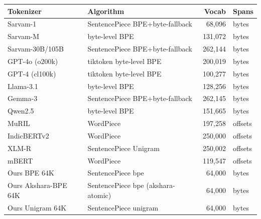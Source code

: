 \begin{tabular}{@{}llrl@{}}
\toprule
Tokenizer & Algorithm & Vocab & Spans \\
\midrule
Sarvam-1 & SentencePiece BPE+byte-fallback & 68,096 & bytes \\
Sarvam-M & byte-level BPE & 131,072 & bytes \\
Sarvam-30B/105B & SentencePiece BPE+byte-fallback & 262,144 & bytes \\
GPT-4o (o200k) & tiktoken byte-level BPE & 200,019 & bytes \\
GPT-4 (cl100k) & tiktoken byte-level BPE & 100,277 & bytes \\
Llama-3.1 & byte-level BPE & 128,256 & bytes \\
Gemma-3 & SentencePiece BPE+byte-fallback & 262,145 & bytes \\
Qwen2.5 & byte-level BPE & 151,665 & bytes \\
MuRIL & WordPiece & 197,258 & offsets \\
IndicBERTv2 & WordPiece & 250,000 & offsets \\
XLM-R & SentencePiece Unigram & 250,002 & offsets \\
mBERT & WordPiece & 119,547 & offsets \\
\midrule
Ours BPE 64K & SentencePiece bpe & 64,000 & bytes \\
Ours Akshara-BPE 64K & SentencePiece bpe (akshara-atomic) & 64,000 & bytes \\
Ours Unigram 64K & SentencePiece unigram & 64,000 & bytes \\
\bottomrule
\end{tabular}
